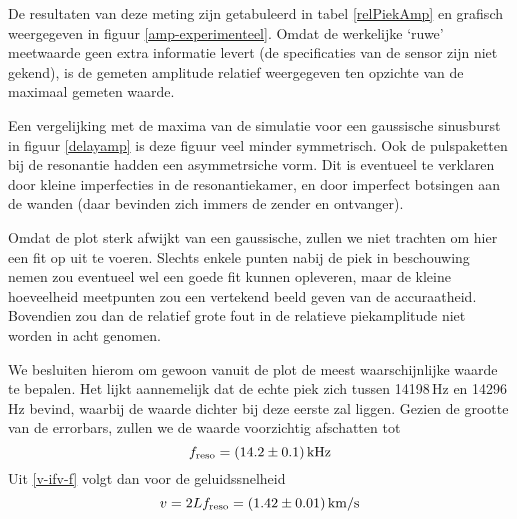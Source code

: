 De resultaten van deze meting zijn getabuleerd in tabel \ref{relPiekAmp} en 
grafisch weergegeven in figuur \ref{amp-experimenteel}. Omdat de werkelijke 
`ruwe' meetwaarde geen extra informatie levert (de specificaties van de 
sensor zijn niet gekend), is de gemeten amplitude relatief weergegeven ten 
opzichte van de maximaal gemeten waarde.

\relPiekAmp
{}

Een vergelijking met de maxima van de simulatie voor een gaussische 
sinusburst in figuur \ref{delayamp} is deze figuur veel minder symmetrisch.  
Ook de pulspaketten bij de resonantie hadden een asymmetrsiche vorm. Dit is 
eventueel te verklaren door kleine imperfecties in de resonantiekamer, en 
door imperfect botsingen aan de wanden (daar bevinden zich immers de zender 
en ontvanger).

Omdat de plot sterk afwijkt van een gaussische, zullen we niet trachten om 
hier een fit op uit te voeren. Slechts enkele punten nabij de piek in 
beschouwing nemen zou eventueel wel een goede fit kunnen opleveren, maar de 
kleine hoeveelheid meetpunten zou een vertekend beeld geven van de 
accuraatheid. Bovendien zou dan de relatief grote fout in de relatieve 
piekamplitude niet worden in acht genomen.

We besluiten hierom om gewoon vanuit de plot de meest waarschijnlijke 
waarde te bepalen. Het lijkt aannemelijk dat de echte piek zich tussen
14198\,Hz en 14296\,Hz bevind, waarbij de waarde dichter bij deze eerste 
zal liggen. Gezien de grootte van de errorbars, zullen we de waarde 
voorzichtig afschatten tot
$$
f_\mathrm{reso} = (14.2 \pm 0.1)\,\rm kHz
$$
Uit \ref{v-ifv-f} volgt dan voor de geluidssnelheid
$$
v = 2Lf_\mathrm{reso}
= (1.42 \pm 0.01)\,\rm km/s
$$






